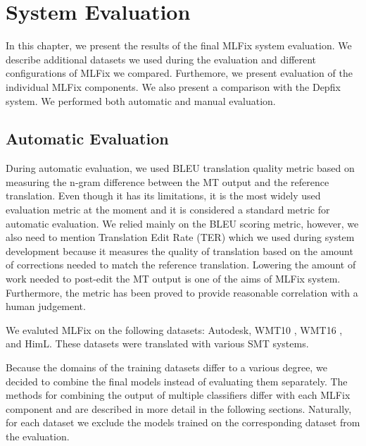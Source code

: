 \chapter{System Evaluation}
\label{chap:eval}

In this chapter, we present the results of the final MLFix system evaluation.
We describe additional datasets we used during the evaluation and different
configurations of MLFix we compared. Furthemore, we present evaluation
of the individual MLFix components.
We also present a comparison with the Depfix
system. We performed both automatic and manual evaluation.

\section{Automatic Evaluation}

During automatic evaluation, we used BLEU \citep{papineni:2002} translation
quality metric based on measuring the n-gram difference between the MT output
and the reference translation.
Even though it has its limitations, it is the most widely used
evaluation metric at the moment and it is considered a standard metric for automatic evaluation.
We relied mainly on the BLEU scoring metric, however, we also need to mention
Translation Edit Rate (TER) \citep{Snover06astudy} which we used during system development because it measures
the quality of translation based on the amount of corrections needed to match
the reference translation. Lowering the amount of work needed to post-edit the MT output
is one of the aims of MLFix system. Furthermore, the metric has been proved to provide
reasonable correlation with a human judgement.

We evaluted MLFix on the following datasets: Autodesk, WMT10\linebreak
\citep{callisonburch-EtAl:2010:WMT}, WMT16 \citep{bojar-EtAl:2016:WMT1}, and HimL.
These datasets
were translated with various SMT systems.

Because the domains of the training datasets differ to a various degree,
we decided to combine the final models instead of evaluating them separately.
The methods for combining the output of multiple classifiers
differ with each MLFix component and are described in more detail in the following
sections.
Naturally, for each dataset we exclude the models trained on the corresponding dataset from
the evaluation.


